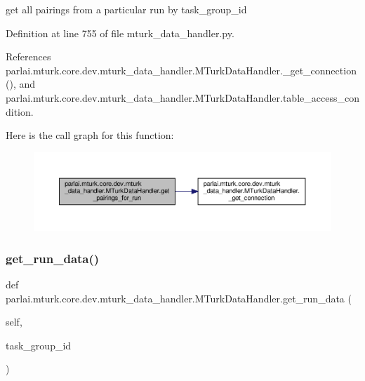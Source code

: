 \begin{DoxyVerb}get all pairings from a particular run by task_group_id\end{DoxyVerb}
 

Definition at line 755 of file mturk\+\_\+data\+\_\+handler.\+py.



References parlai.\+mturk.\+core.\+dev.\+mturk\+\_\+data\+\_\+handler.\+M\+Turk\+Data\+Handler.\+\_\+get\+\_\+connection(), and parlai.\+mturk.\+core.\+dev.\+mturk\+\_\+data\+\_\+handler.\+M\+Turk\+Data\+Handler.\+table\+\_\+access\+\_\+condition.

Here is the call graph for this function\+:
\nopagebreak
\begin{figure}[H]
\begin{center}
\leavevmode
\includegraphics[width=350pt]{classparlai_1_1mturk_1_1core_1_1dev_1_1mturk__data__handler_1_1MTurkDataHandler_aac09cee0791b834add5a50e430b6030e_cgraph}
\end{center}
\end{figure}
\mbox{\label{classparlai_1_1mturk_1_1core_1_1dev_1_1mturk__data__handler_1_1MTurkDataHandler_a915eb49ef703f1606b8039a76b6a9385}} 
\subsubsection{\texorpdfstring{get\+\_\+run\+\_\+data()}{get\_run\_data()}}
{\footnotesize\ttfamily def parlai.\+mturk.\+core.\+dev.\+mturk\+\_\+data\+\_\+handler.\+M\+Turk\+Data\+Handler.\+get\+\_\+run\+\_\+data (\begin{DoxyParamCaption}\item[{}]{self,  }\item[{}]{task\+\_\+group\+\_\+id }\end{DoxyParamCaption})}

